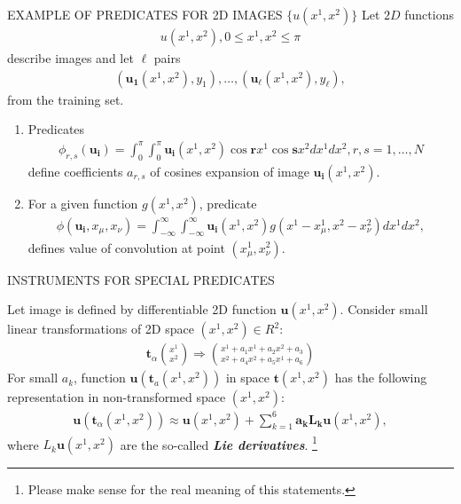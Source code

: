 \documentclass[11pt]{beamer}
\begin{document}
\begin{frame}{EXAMPLE OF PREDICATES FOR 2D IMAGES $\{u(x^{1}, x^{2})\}$}
Let $2D$ functions
\begin{align*}
u(x^{1}, x^{2}), 0 \leq x^{1}, x^{2} \leq \pi
\end{align*}
describe images and let $\ell$ pairs
\begin{align*}
(\mathbf{u_{1}}(x^{1}, x^{2}), y_{1}), \ldots, (\mathbf{u_{\ell}}(x^{1}, x^{2}), y_{\ell}),
\end{align*}
from the training set.
\begin{enumerate}
\item Predicates
\begin{align*}
\phi_{r, s}(\mathbf{u_{i}}) = \int_{0}^{\pi} \int_{0}^{\pi}\mathbf{u_{i}}(x^{1}, x^{2})\cos\mathbf{r}x^{1}\cos\mathbf{s}x^{2}dx^{1}dx^{2}, r, s = 1, \ldots, N
\end{align*}
define coefficients $a_{r, s}$ of cosines expansion of image $\mathbf{u_{i}}(x^{1}, x^{2})$.
\item For a given function $g(x^{1}, x^{2})$, predicate
\begin{align*}
\phi(\mathbf{u_{i}}, x_{\mu}, x_{\nu}) = \int_{-\infty}^{\infty}\int_{-\infty}^{\infty}\mathbf{u_{i}}(x^{1}, x^{2})g(x^{1} - x_{\mu}^{1}, x^{2} - x_{\nu}^{2})dx^{1}dx^{2},
\end{align*}
defines value of convolution at point $(x_{\mu}^{1}, x_{\nu}^{2})$.
\end{enumerate}
\end{frame}


\begin{frame}{INSTRUMENTS FOR SPECIAL PREDICATES}
\begin{center}
{\color{blue}{LIE DERIVATIVES}}
\end{center}
Let image is defined by differentiable 2D function $\mathbf{u}(x^{1}, x^{2})$. Consider small linear transformations of 2D space $(x^{1}, x^{2}) \in R^{2}$:
\begin{align*}
\mathbf{t}_\alpha\binom{x^1}{x^2} \Longrightarrow\binom{x^1+a_1 x^1+a_2 x^2+a_3}{x^2+a_4 x^2+a_5 x^1+a_6}
\end{align*}
For 	small $a_{k}$, function $\mathbf{u}(\mathbf{t}_{a}(x^{1}, x^{2}))$ in space $\mathbf{t}(x^{1}, x^{2})$ has the following representation in non-transformed space $(x^{1}, x^{2})$:
\begin{align*}
\mathbf{u}(\mathbf{t}_{\alpha}(x^{1}, x^{2})) \approx \mathbf{u}(x^{1}, x^{2}) + \sum_{k=1}^{6}\mathbf{a_{k}}\mathbf{L_{k}}\mathbf{u}(x^{1}, x^{2}),
\end{align*}
where $L_{k}\mathbf{u}(x^{1}, x^{2})$ are the so-called \textit{\textbf{Lie derivatives}}.
\footnote{Please make sense for the real meaning of this statements.}
\end{frame}
\end{document}
